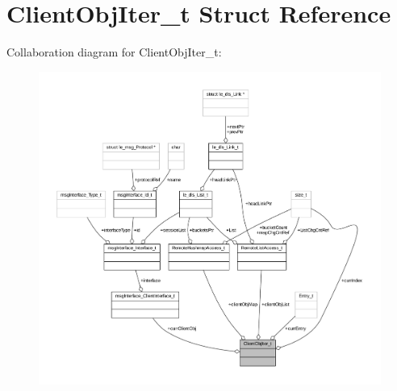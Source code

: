 \hypertarget{struct_client_obj_iter__t}{}\section{Client\+Obj\+Iter\+\_\+t Struct Reference}
\label{struct_client_obj_iter__t}


Collaboration diagram for Client\+Obj\+Iter\+\_\+t\+:
\nopagebreak
\begin{figure}[H]
\begin{center}
\leavevmode
\includegraphics[width=350pt]{struct_client_obj_iter__t__coll__graph}
\end{center}
\end{figure}
